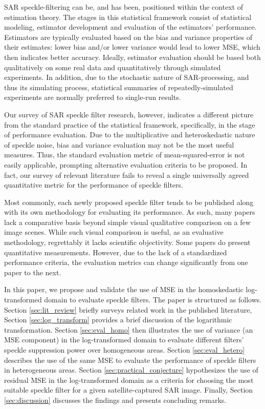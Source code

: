 \documentclass[journal]{IEEEtran}
\begin{document}
SAR speckle-filtering can be, and has been, positioned within the context of estimation theory\cite{Touzi_2002_TGRS}. 
The stages in this statistical framework consist of statistical modeling, estimator development and evaluation of the estimators' performance. 
Estimators are typically evaluated based on the bias and variance properties of their estimates:
  lower bias and/or lower variance would lead to lower MSE, which then indicates better accuracy.
Ideally, estimator evaluation should be based both qualitatively on some real data and quantitatively through simulated experiments. 
In addition, due to the stochastic nature of SAR-processing, and thus its simulating process, 
	statistical summaries of repeatedly-simulated experiments are normally preferred to single-run results.

Our survey of SAR speckle filter research, however, indicates 
	a different picture from the standard practice of the statistical framework, 
	specifically, in the stage of performance evaluation. 
Due to the multiplicative and heteroskedastic nature of speckle noise, 
	bias and variance evaluation may not be the most useful measures. 
Thus, the standard evaluation metric of mean-squared-error is not easily applicable,
	prompting alternative evaluation criteria to be proposed.
In fact, our survey of relevant literature fails to reveal 
	a single universally agreed quantitative metric for the performance of speckle filters.

Most commonly, each newly proposed speckle filter tends to be published along with its own methodology for evaluating its 
	performance. 
As such, many papers lack a comparative basis beyond simple visual qualitative comparison on a few image scenes. 
While such visual comparison is useful, as an evaluative methodology, regrettably it lacks scientific objectivity. 
Some papers do present quantitative measurements. 
However, due to the lack of a standardized performance criteria, 
	the evaluation metrics can change significantly from one paper to the next.

In this paper, we propose and validate the use of MSE in the homoskedastic log-transformed domain to evaluate speckle filters. 
The paper is structured as follows.
Section \ref{sec:lit_review} briefly surveys related work in the published literature, 
Section \ref{sec:log_transform} provides a brief discussion of the logarithmic transformation.
Section \ref{sec:eval_homo} then illustrates the use of variance (an MSE component) in the log-transformed domain to 
	evaluate different filters' speckle suppression power over homogeneous areas.
Section \ref{sec:eval_hetero} describes the use of the same MSE to evaluate the performance of speckle filters in heterogeneous areas.
Section \ref{sec:practical_conjecture} hypothesizes the use of residual MSE in the log-transformed domain 
	as a criteria for choosing the most suitable speckle filter for a given satellite-captured SAR image.
Finally, Section \ref{sec:discussion} discusses the findings and presents concluding remarks.
\end{document}
